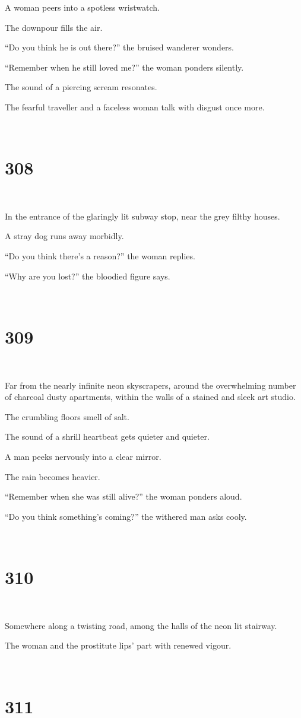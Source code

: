 \documentclass{report}
\begin{document}
A woman peers into a spotless wristwatch.

The downpour fills the air.

``Do you think he is out there?'' the bruised wanderer wonders.

``Remember when he still loved me?'' the woman ponders silently.

The sound of a piercing scream resonates.

The fearful traveller and a faceless woman talk with disgust once more.

~
\chapter*{308}
~

In the entrance of the glaringly lit subway stop, near the grey filthy houses.

A stray dog runs away morbidly.

``Do you think there's a reason?'' the woman replies.

``Why are you lost?'' the bloodied figure says.

~
\chapter*{309}
~

Far from the nearly infinite neon skyscrapers, around the overwhelming number of charcoal dusty apartments, within the walls of a stained and sleek art studio.

The crumbling floors smell of salt.

The sound of a shrill heartbeat gets quieter and quieter.

A man peeks nervously into a clear mirror.

The rain becomes heavier.

``Remember when she was still alive?'' the woman ponders aloud.

``Do you think something's coming?'' the withered man asks cooly.

~
\chapter*{310}
~

Somewhere along a twisting road, among the halls of the neon lit stairway.

The woman and the prostitute lips' part with renewed vigour.

~
\chapter*{311}
~
\end{document}
